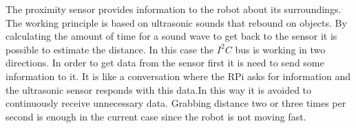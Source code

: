 The proximity sensor provides information to the robot about its surroundings. The working principle is based on ultrasonic sounds that rebound on objects. By calculating the amount of time for a sound wave to get back to the sensor it is possible to estimate the distance. In this case the $I^{2}C$ bus is working in two directions. In order to get data from the sensor first it is need to send some information to it. It is like a conversation where the RPi asks for information and the ultrasonic sensor responds with this data.In this way it is avoided to continuously receive unnecessary data. Grabbing distance two or three times per second is enough in the current case since the robot is not moving fast.
